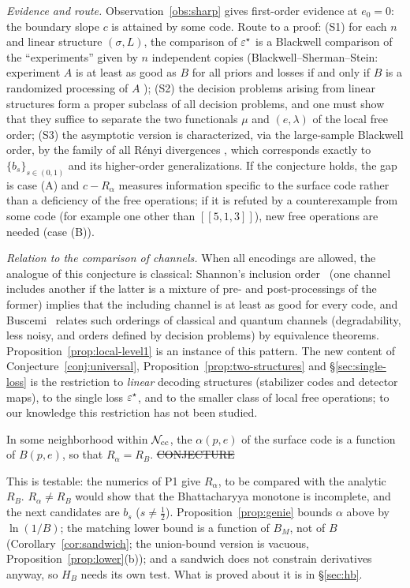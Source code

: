\noindent\emph{Evidence and route.} Observation~\ref{obs:sharp} gives first-order evidence at $e_0=0$: the boundary slope $c$ is attained by some code.
Route to a proof: (S1) for each $n$ and linear structure $(\sigma,L)$, the comparison of $\varepsilon^{\star}$ is a Blackwell comparison of the ``experiments'' given by $n$ independent copies
(Blackwell--Sherman--Stein: experiment $A$ is at least as good as $B$ for all priors and losses if and only if $B$ is a randomized processing of $A$ \cite{Blackwell});
(S2) the decision problems arising from linear structures form a proper subclass of all decision problems, and one must show that they suffice to separate the two functionals $\mu$ and $(e,\lambda)$ of the local free order;
(S3) the asymptotic version is characterized, via the large-sample Blackwell order, by the family of all R\'enyi divergences \cite{MPST}, which corresponds exactly to $\{b_s\}_{s\in(0,1)}$ and its higher-order generalizations.
If the conjecture holds, the gap is case (A) and $c-R_\alpha$ measures information specific to the surface code rather than a deficiency of the free operations;
if it is refuted by a counterexample from some code (for example one other than $[[5,1,3]]$), new free operations are needed (case (B)).

\noindent\emph{Relation to the comparison of channels.} When all encodings are allowed, the analogue of this conjecture is classical: Shannon's inclusion order~\cite{Shannon58} (one channel includes another if the latter is a mixture of pre- and post-processings of the former) implies that the including channel is at least as good for every code, and Buscemi~\cite{Buscemi18,Buscemi16} relates such orderings of classical and quantum channels (degradability, less noisy, and orders defined by decision problems) by equivalence theorems. Proposition~\ref{prop:local-level1} is an instance of this pattern. The new content of Conjecture~\ref{conj:universal}, Proposition~\ref{prop:two-structures} and \S\ref{sec:single-loss} is the restriction to \emph{linear} decoding structures (stabilizer codes and detector maps), to the single loss $\varepsilon^{\star}$, and to the smaller class of local free operations; to our knowledge this restriction has not been studied.

\begin{conjecture}\label{conj:HB}
In some neighborhood within $\mathcal{N}_{\rm cc}$, the $\alpha(p,e)$ of the surface code is a function of $B(p,e)$, so that $R_\alpha=R_B$.
\hfill\st{CONJECTURE}
\end{conjecture}
\noindent This is testable: the numerics of P1 give $R_\alpha$, to be compared with the analytic $R_B$. $R_\alpha\neq R_B$ would show that
the Bhattacharyya monotone is incomplete, and the next candidates are $b_s$ ($s\ne\tfrac12$). Proposition~\ref{prop:genie} bounds $\alpha$ above by $\ln(1/B)$; the matching lower bound is a function of $B_M$, not of $B$ (Corollary~\ref{cor:sandwich}; the union-bound version is vacuous, Proposition~\ref{prop:lower}(b)); and a sandwich does not constrain derivatives anyway, so $H_B$ needs its own test. What is proved about it is in \S\ref{sec:hb}.


